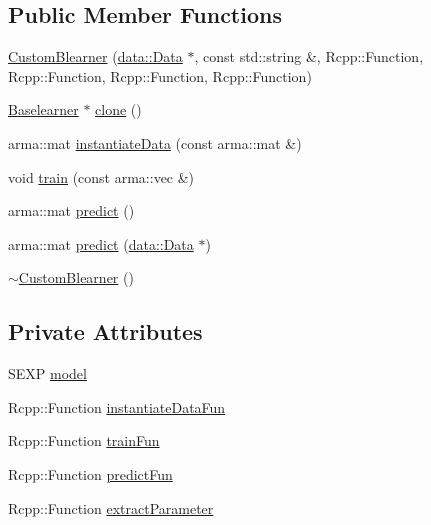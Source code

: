 \subsection*{Public Member Functions}
\begin{DoxyCompactItemize}
\item 
\mbox{\hyperlink{classblearner_1_1_custom_blearner_a99b05f69e8d3cacfab556b6a5310f50a}{Custom\+Blearner}} (\mbox{\hyperlink{classdata_1_1_data}{data\+::\+Data}} $\ast$, const std\+::string \&, Rcpp\+::\+Function, Rcpp\+::\+Function, Rcpp\+::\+Function, Rcpp\+::\+Function)
\item 
\mbox{\hyperlink{classblearner_1_1_baselearner}{Baselearner}} $\ast$ \mbox{\hyperlink{classblearner_1_1_custom_blearner_a7ceeee2b7fffd11f376018bc1d3cfba1}{clone}} ()
\item 
arma\+::mat \mbox{\hyperlink{classblearner_1_1_custom_blearner_a18971368219f6948456b8e60c20b6968}{instantiate\+Data}} (const arma\+::mat \&)
\item 
void \mbox{\hyperlink{classblearner_1_1_custom_blearner_a4726c5b861b67817f7b3eb61d8f6c0d7}{train}} (const arma\+::vec \&)
\item 
arma\+::mat \mbox{\hyperlink{classblearner_1_1_custom_blearner_a20b5fe06512aa73478b9f934e1c81c31}{predict}} ()
\item 
arma\+::mat \mbox{\hyperlink{classblearner_1_1_custom_blearner_a401a479834eb3896260cb57b4551ceb4}{predict}} (\mbox{\hyperlink{classdata_1_1_data}{data\+::\+Data}} $\ast$)
\item 
\mbox{\hyperlink{classblearner_1_1_custom_blearner_ada8c7351aa50e8149dfd546840c51f51}{$\sim$\+Custom\+Blearner}} ()
\end{DoxyCompactItemize}
\subsection*{Private Attributes}
\begin{DoxyCompactItemize}
\item 
S\+E\+XP \mbox{\hyperlink{classblearner_1_1_custom_blearner_a7e802c5c67838d6d5a411f26a536d657}{model}}
\item 
Rcpp\+::\+Function \mbox{\hyperlink{classblearner_1_1_custom_blearner_a97bbb549bc85799ec40d3a67cb204222}{instantiate\+Data\+Fun}}
\item 
Rcpp\+::\+Function \mbox{\hyperlink{classblearner_1_1_custom_blearner_a59f400a2816f5d0a3488a9a9179c1e05}{train\+Fun}}
\item 
Rcpp\+::\+Function \mbox{\hyperlink{classblearner_1_1_custom_blearner_a377ecf33cffd26e1079407be20a8b2c5}{predict\+Fun}}
\item 
Rcpp\+::\+Function \mbox{\hyperlink{classblearner_1_1_custom_blearner_a95a77720324a16190f84612ea0c0e812}{extract\+Parameter}}
\end{DoxyCompactItemize}

